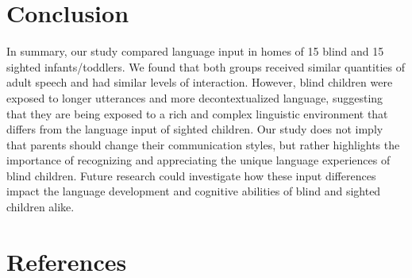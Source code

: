 \documentclass[
  man]{apa6}
\begin{document}
\hypertarget{conclusion}{%
\section{Conclusion}\label{conclusion}}

In summary, our study compared language input in homes of 15 blind and 15 sighted infants/toddlers. We found that both groups received similar quantities of adult speech and had similar levels of interaction. However, blind children were exposed to longer utterances and more decontextualized language, suggesting that they are being exposed to a rich and complex linguistic environment that differs from the language input of sighted children. Our study does not imply that parents should change their communication styles, but rather highlights the importance of recognizing and appreciating the unique language experiences of blind children. Future research could investigate how these input differences impact the language development and cognitive abilities of blind and sighted children alike.

\hypertarget{references}{%
\section*{References}\label{references}}
\end{document}
